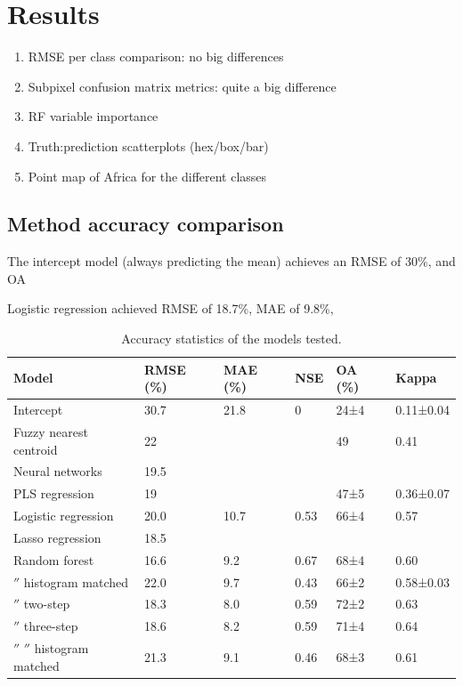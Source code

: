 \documentclass[a4paper,10pt]{article}
\begin{document}
\section{Results}

\begin{enumerate}
 \item RMSE per class comparison: no big differences
 \item Subpixel confusion matrix metrics: quite a big difference
 \item RF variable importance
 \item Truth:prediction scatterplots (hex/box/bar)
 \item Point map of Africa for the different classes
\end{enumerate}

\subsection{Method accuracy comparison}

The intercept model (always predicting the mean) achieves an \ac{RMSE} of 30\%, and \ac{OA}

Logistic regression achieved RMSE of 18.7\%, MAE of 9.8\%, 

\begin{table}
\centering
\begin{tabular}{llllll}
\toprule
\textbf{Model} & \textbf{\ac{RMSE} (\%)} & \textbf{\ac{MAE} (\%)} & \textbf{\acrshort{NSE}} & \textbf{\ac{OA} (\%)} & \textbf{Kappa} \\
\midrule
Intercept
& 30.7  & 21.8  & 0     & 24±4  & 0.11±0.04 \\
Fuzzy nearest centroid
& 22    &       &       & 49    & 0.41      \\
Neural networks
& 19.5  &       &       &       &           \\
PLS regression
& 19    &       &       & 47±5  & 0.36±0.07 \\
Logistic regression
& 20.0  & 10.7  & 0.53  & 66±4  & 0.57      \\
Lasso regression
& 18.5  &       &       &       &           \\
Random forest
& 16.6  & 9.2   & 0.67  & 68±4  & 0.60      \\
\ensuremath{''} histogram matched
& 22.0  & 9.7   & 0.43  & 66±2  & 0.58±0.03 \\
\ensuremath{''} two-step
& 18.3  & 8.0   & 0.59  & 72±2  & 0.63      \\
\ensuremath{''} three-step
& 18.6  & 8.2   & 0.59  & 71±4  & 0.64      \\
\ensuremath{''} \ensuremath{''} histogram matched
& 21.3  & 9.1   & 0.46  & 68±3  & 0.61      \\
\bottomrule
\end{tabular}
\caption{Accuracy statistics of the models tested.}
\label{tab-accuracy}
\end{table}
\end{document}
